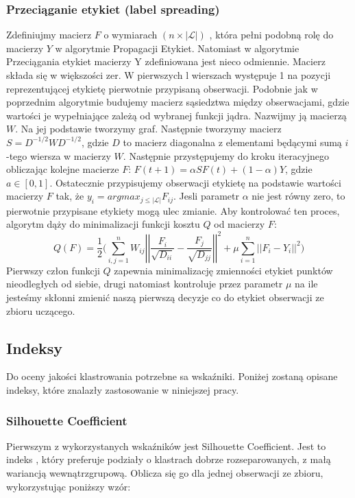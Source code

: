 \documentclass{article}
\begin{document}
\subsubsection{Przeciąganie etykiet (label spreading)}
Zdefiniujmy macierz \(F\) o wymiarach \((n \times |\mathcal{L}|)\) , która pełni podobną rolę do macierzy \(Y\) w algorytmie Propagacji Etykiet.
Natomiast w algorytmie Przeciągania etykiet macierzy Y zdefiniowana jest nieco odmiennie.
Macierz składa się w większości zer. W pierwszych l wierszach występuje 1 na pozycji reprezentującej etykietę pierwotnie przypisaną obserwacji.
Podobnie jak w poprzednim algorytmie budujemy macierz sąsiedztwa między obserwacjami, gdzie wartości je wypełniające zależą od wybranej funkcji jądra.
Nazwijmy ją macierzą \(W\). Na jej podstawie tworzymy graf. 
Następnie tworzymy macierz \(S = D^{-1/2}WD^{-1/2}\), gdzie \(D\) to macierz diagonalna z elementami będącymi sumą \(i\)-tego wiersza w macierzy \(W\).
Następnie przystępujemy do kroku iteracyjnego obliczając kolejne macierze \(F\): \(F(t+1) = \alpha SF(t) + (1 - \alpha)Y\), gdzie \(a \in [0,1]\).
Ostatecznie przypisujemy obserwacji etykietę na podstawie wartości macierzy \(F\) tak, że \(y_i = argmax_{j\leqslant |\mathcal{L}|} F_{ij}\).
Jesli parametr \(\alpha\) nie jest równy zero, to pierwotnie przypisane etykiety mogą ulec zmianie.
Aby kontrolować ten proces, algorytm dąży do minimalizacji funkcji kosztu \(Q\) od macierzy \(F\):
\[Q(F) = \frac{1}{2}\bigg(\sum\limits^n_{i,j=1}W_{ij}\left|\left| \frac{F_i}{\sqrt{D_{ii}}} -
\frac{F_j}{\sqrt{D_{jj}}}\right|\right|^2 + \mu\sum\limits^n_{i=1}
\left|\left|F_i - Y_i\right|\right|^2 \bigg)\]
Pierwszy człon funkcji \(Q\) zapewnia minimalizację zmienności etykiet punktów nieodległych od siebie, drugi natomiast kontroluje przez parametr \(\mu\) na ile jesteśmy skłonni zmienić naszą pierwszą decyzje co do etykiet obserwacji ze zbioru uczącego\citep{Zhou2004}.	
\subsection{Indeksy}
Do oceny jakości klastrowania potrzebne sa wskaźniki.
Poniżej zostaną opisane indeksy, które znalazły zastosowanie w niniejszej pracy.

\subsubsection{Silhouette Coefficient}
\label{roz_silhouette_coeff}
Pierwszym z wykorzystanych wskaźników jest Silhouette Coefficient.
Jest to indeks , który preferuje podziały o klastrach dobrze rozseparowanych, z małą wariancją wewnątrzgrupową\citep{Arbelaitz2013}. Oblicza się go dla jednej obserwacji ze zbioru, wykorzystując poniższy wzór:
\end{document}
